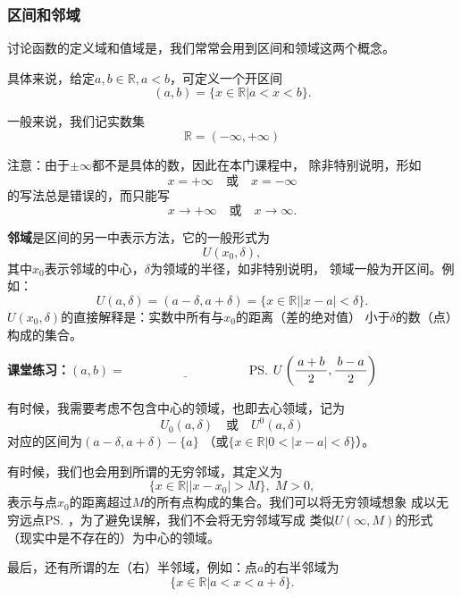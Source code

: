 \subsubsection*{区间和邻域}

讨论函数的定义域和值域是，我们常常会用到区间和领域这两个概念。

具体来说，给定$a,b\in\mathbb{R},a<b$，可定义一个开区间
$$(a,b)=\{x\in\mathbb{R}|a<x<b\}.$$

一般来说，我们记实数集
$$\mathbb{R}=(-\infty,+\infty)$$

{\baa 注意：由于$\pm\infty$都不是具体的数，因此在本门课程中，
除非特别说明，形如
$$x=+\infty\quad\mbox{或}\quad x=-\infty$$
的写法总是错误的，而只能写
$$x\to+\infty\quad\mbox{或}\quad x\to\infty.$$
}

{\bf 邻域}是区间的另一中表示方法，它的一般形式为
$$U(x_0,\delta),$$
其中$x_0$表示邻域的中心，$\delta$为领域的半径，如非特别说明，
领域一般为开区间。例如：
$$U(a,\delta)=(a-\delta,a+\delta)=\{x\in\mathbb{R}||x-a|<\delta\}.$$
$U(x_0,\delta)$的直接解释是：实数中所有与$x_0$的距离（差的绝对值）
小于$\delta$的数（点）构成的集合。

\bs

{\bf 课堂练习：}$(a,b)=\underline{\hspace{4cm}}$
\ifhint\ps{$U\left(\displaystyle\frac{\,{a+b}\,}{\,{2}\,},\displaystyle\frac{\,{b-a}\,}{\,{2}\,}\right)$}\fi

\bs

有时候，我需要考虑不包含中心的领域，也即{\kaishu 去心领域}，记为
$$
U_0(a,\delta)\quad\mbox{或}\quad U^0(a,\delta)$$
对应的区间为$(a-\delta,a+\delta)-\{a\}$
（或$\{x\in\mathbb{R}|0<|x-a|<\delta\}$）。

有时候，我们也会用到所谓的{\kaishu 无穷邻域}，其定义为
$$\{x\in\mathbb{R}||x-x_0|>M\},\;M>0,$$
表示与点$x_0$的距离超过$M$的所有点构成的集合。我们可以将无穷领域想象
成以{\kaishu 无穷远点}\ps{，为了避免误解，我们不会将无穷邻域写成
类似$U(\infty,M)$的形式}
（现实中是不存在的）为中心的领域。

最后，还有所谓的{\kaishu 左（右）半邻域}，例如：点$a$的右半邻域为
$$\{x\in\mathbb{R}|a<x<a+\delta\}.$$

